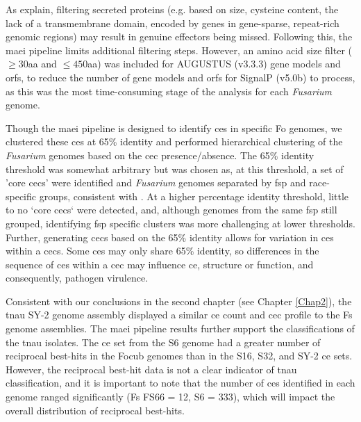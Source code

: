 As \textcite{LoPresti2015, Sperschneider2015} explain, filtering secreted proteins (e.g. based on size, cysteine content, the lack of a transmembrane domain, encoded by genes in gene-sparse, repeat-rich genomic regions) may result in genuine effectors being missed. Following this, the \ac{maei} pipeline limits additional filtering steps. However, an amino acid size filter ($\geq30$aa and $\leq450$aa) was included for AUGUSTUS (v3.3.3) gene models and \acp{orf}, to reduce the number of gene models and \acp{orf} for SignalP (v5.0b) to process, as this was the most time-consuming stage of the analysis for each \textit{Fusarium} genome. 

Though the \ac{maei} pipeline is designed to identify \acp{ce} in specific \ac{Fo} genomes, we clustered these \acp{ce} at 65\% identity and performed hierarchical clustering of the \textit{Fusarium} genomes based on the \ac{cec} presence/absence. The 65\% identity threshold was somewhat arbitrary but was chosen as, at this threshold, a set of 'core  \acp{cec}' were identified and \textit{Fusarium} genomes separated by \ac{fsp} and race-specific groups, consistent with \textcite{Dam2016,FoEC2}. At a higher percentage identity threshold, little to no `core \acp{cec}` were detected, and, although genomes from the same \ac{fsp} still grouped, identifying \ac{fsp} specific clusters was more challenging at lower thresholds. Further, generating \acp{cec} based on the 65\% identity allows for variation in \aclp{ce} within a \acp{cec}. Some \acp{ce} may only share 65\% identity, so differences in the sequence of \acp{ce} within a \ac{cec} may influence \ac{ce}, structure or function, and consequently, pathogen virulence. 

Consistent with our conclusions in the second chapter (see Chapter \ref{Chap2}), the \ac{tnau} SY-2 genome assembly displayed a similar \ac{ce} count and \ac{cec} profile to the \ac{Fs} genome assemblies. The \ac{maei} pipeline results further support the classifications of the \ac{tnau} isolates. The \ac{ce} set from the S6 genome had a greater number of reciprocal best-hits in the \ac{Focub} genomes than in the S16, S32, and SY-2 \ac{ce} sets. However, the reciprocal best-hit data is not a clear indicator of \ac{tnau} classification, and it is important to note that the number of \acp{ce} identified in each genome ranged significantly (\ac{Fs} FS66 = 12, S6 = 333), which will impact the overall distribution of reciprocal best-hits. 

